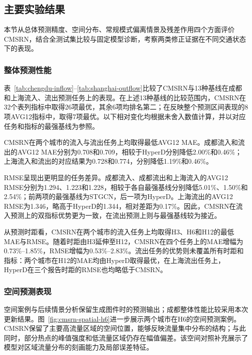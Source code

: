 \subsection{主要实验结果}\label{sec:exp-main-results}

本节从总体预测精度、空间分布、常规模式偏离情景及残差作用四个方面评价CMSRN，结合全测试集比较与固定模型诊断，考察两类修正证据在不同交通状态下的表现。

\subsubsection{整体预测性能}\label{sec:results-overall}

表~\ref{tab:chengdu-inflow}--\ref{tab:shanghai-outflow}比较了CMSRN与13种基线在成都和上海流入、流出预测任务上的表现。在上述13种基线的比较范围内，CMSRN在32个表列指标中取得26项最优，其余6项均排名第二；在反映整个预测区间表现的8项AVG12指标中，取得7项最优。以下相对变化均根据未舍入数值计算，并以对应任务和指标的最强基线为参照。

CMSRN在两个城市的流入与流出任务上均取得最低AVG12 MAE。成都流入和流出的AVG12 MAE分别为0.708和0.709，相较于HyperD分别降低2.00\%和0.46\%；上海流入和流出的对应结果为0.728和0.774，分别降低1.19\%和0.46\%。

RMSE呈现出更明显的任务差异。成都流入、成都流出和上海流入的AVG12 RMSE分别为1.294、1.223和1.228，相较于各自最强基线分别降低5.01\%、1.50\%和2.54\%；前两项的最强基线为STGCN，后一项为HyperD。上海流出的AVG12 RMSE为1.346，略高于HyperD的1.344，相对差距为0.17\%。因此，CMSRN在流入预测上的双指标优势更为一致，在流出预测上则与最强基线较为接近。

从预测时距看，CMSRN在两个城市的流入任务上均取得H3、H6和H12的最低MAE与RMSE。随着时距由H3延伸至H12，CMSRN在四个任务上的MAE增幅为0.73\%--1.85\%，RMSE增幅为0.53\%--2.83\%。流出任务的优势则未覆盖所有时距和指标：两个城市在H12的MAE均由HyperD取得最优，在上海流出任务上，HyperD在三个报告时距的RMSE也均略低于CMSRN。






\subsubsection{空间预测表现}\label{sec:results-spatial}

空间案例与后续情景分析保留生成图件时的预测输出；成都整体性能比较采用本次更新结果。图~\ref{fig:cmsrn-spatial-h6}进一步展示两个城市在H6的空间预测案例。CMSRN保留了主要高流量区域的空间位置，能够反映流量集中分布的结构；与此同时，部分热点的峰值强度和低流量区域仍存在幅值偏差。该空间对照补充展示了模型对区域流量分布的刻画能力及局部误差特征。

